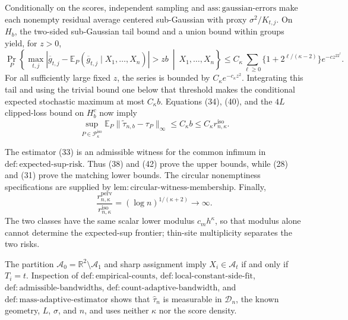Conditionally on the scores, independent sampling and
\(\mathrm{ass:gaussian\text{-}errors}\) make each nonempty residual
average centered sub-Gaussian with proxy \(\sigma^2/K_{t,j}\).  On
\(H_b\), the two-sided sub-Gaussian tail bound and a union bound within
groups yield, for \(z>0\),
\[
 \Pr_P\left\{
 \max_{t,j}\left|\overline g_{t,j}-
 \mathbb E_P(\overline g_{t,j}\mid X_1,\ldots,X_n)\right|>zb
 \ \middle|\ X_1,\ldots,X_n\right\}
 \le C_{\kappa}\sum_{\ell\ge0}
 \{1+2^{\ell/(\kappa-2)}\}e^{-cz^22^\ell}. \tag{41}
\]
For all sufficiently large fixed \(z\), the series is bounded by
\(C_{\kappa}e^{-c_{\kappa}z^2}\).  Integrating this
tail and using the trivial bound one below that threshold makes the
conditional expected stochastic maximum at most
\(C_{\kappa}b\).  Equations (34), (40), and the \(4L\)
clipped-loss bound on \(H_b^c\) now imply
\[
 \sup_{P\in\mathcal P_{\kappa}^{\mathrm{iso}}}
 \mathbb E_P\lVert\widetilde\tau_{n,b}-\tau_P\rVert_{\infty}
 \le C_{\kappa}b
 \le C_{\kappa}r_{n,\kappa}^{\mathrm{iso}}. \tag{42}
\]

The estimator (33) is an admissible witness for the common infimum in
\(\mathrm{def:expected\text{-}sup\text{-}risk}\).  Thus (38) and (42)
prove the upper bounds, while (28) and (31) prove the matching lower
bounds.  The circular nonemptiness specifications are supplied by
\(\mathrm{lem:circular\text{-}witness\text{-}membership}\).  Finally,
\[
 \frac{r_{n,\kappa}^{\mathrm{perv}}}{r_{n,\kappa}^{\mathrm{iso}}}
 =(\log n)^{1/(\kappa+2)}\longrightarrow\infty.
\]
The two classes have the same scalar lower modulus \(c_mh^{\kappa}\), so
that modulus alone cannot determine the expected-sup frontier;
thin-site multiplicity separates the two risks.

The partition \(\mathcal A_0=\mathbb R^2\setminus\mathcal A_1\) and sharp
assignment imply \(X_i\in\mathcal A_t\) if and only if \(T_i=t\).
Inspection of \(\mathrm{def:empirical\text{-}counts}\),
\(\mathrm{def:local\text{-}constant\text{-}side\text{-}fit}\),
\(\mathrm{def:admissible\text{-}bandwidths}\),
\(\mathrm{def:count\text{-}adaptive\text{-}bandwidth}\), and
\(\mathrm{def:mass\text{-}adaptive\text{-}estimator}\) shows that
\(\widehat\tau_n\) is measurable in \(\mathcal D_n\), the known
geometry, \(L\), \(\sigma\), and \(n\), and uses neither \(\kappa\) nor
the score density.

